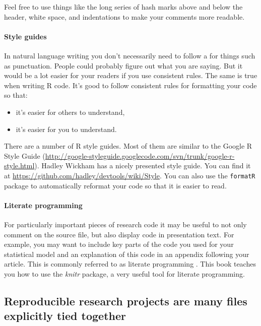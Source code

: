 \noindent Feel free to use things like the long series of hash marks above and below the header, white space, and indentations to make your comments more readable. 

\paragraph{Style guides}
In natural language writing you don't necessarily need to follow a  for things such as punctuation. People could probably figure out what you are saying. But it would be a lot easier for your readers if you use consistent rules. The same is true when writing R code. It's good to follow consistent rules for formatting your code so that:

\begin{itemize}
    \item it's easier for others to understand,
    \item it's easier for you to understand.
\end{itemize}

There are a number of R style guides. Most of them are similar to the Google R Style Guide  (\url{http://google-styleguide.googlecode.com/svn/trunk/google-r-style.html}). Hadley Wickham  has a nicely presented style guide. You can find it at \url{https://github.com/hadley/devtools/wiki/Style}. You can also use the {\tt{formatR}}  package to automatically reformat your code so that it is easier to read.

\paragraph{Literate programming}

For particularly important pieces of research code it may be useful to not only comment on the source file, but also display code in presentation text. For example, you may want to include key parts of the code you used for your statistical model and an explanation of this code in an appendix following your article. This is commonly referred to as literate programming  \cite[]{Knuth1992}. This book teaches you how to use the {\emph{knitr}} package, a very useful tool for literate programming. 

\subsection{Reproducible research projects are many files explicitly tied together}

